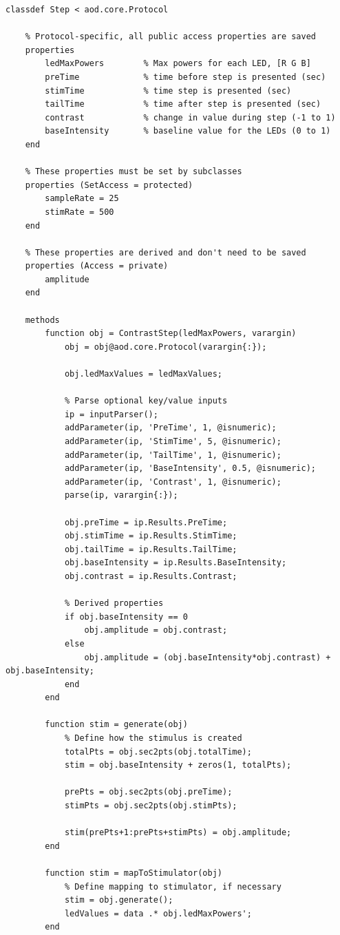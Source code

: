 \documentclass[10pt]{exam}
\begin{document}
		\begin{lstlisting}[style=Matlab-editor, basicstyle=\mlttfamily\footnotesize]
classdef Step < aod.core.Protocol
	
	% Protocol-specific, all public access properties are saved
	properties
		ledMaxPowers        % Max powers for each LED, [R G B]
		preTime             % time before step is presented (sec)
		stimTime            % time step is presented (sec)
		tailTime            % time after step is presented (sec)
		contrast            % change in value during step (-1 to 1)
		baseIntensity       % baseline value for the LEDs (0 to 1)
	end
	
	% These properties must be set by subclasses
	properties (SetAccess = protected)
		sampleRate = 25
		stimRate = 500
	end
	
	% These properties are derived and don't need to be saved
	properties (Access = private)
		amplitude
	end
	
	methods
		function obj = ContrastStep(ledMaxPowers, varargin)
			obj = obj@aod.core.Protocol(varargin{:});
			
			obj.ledMaxValues = ledMaxValues;
			
			% Parse optional key/value inputs
			ip = inputParser();
			addParameter(ip, 'PreTime', 1, @isnumeric);
			addParameter(ip, 'StimTime', 5, @isnumeric);
			addParameter(ip, 'TailTime', 1, @isnumeric);
			addParameter(ip, 'BaseIntensity', 0.5, @isnumeric);
			addParameter(ip, 'Contrast', 1, @isnumeric);
			parse(ip, varargin{:});
			
			obj.preTime = ip.Results.PreTime;
			obj.stimTime = ip.Results.StimTime;
			obj.tailTime = ip.Results.TailTime;
			obj.baseIntensity = ip.Results.BaseIntensity;
			obj.contrast = ip.Results.Contrast;

			% Derived properties
			if obj.baseIntensity == 0
				obj.amplitude = obj.contrast;
			else 
				obj.amplitude = (obj.baseIntensity*obj.contrast) + obj.baseIntensity;
			end
		end
		
		function stim = generate(obj)
			% Define how the stimulus is created
			totalPts = obj.sec2pts(obj.totalTime);
			stim = obj.baseIntensity + zeros(1, totalPts);
			
			prePts = obj.sec2pts(obj.preTime);
			stimPts = obj.sec2pts(obj.stimPts);
			
			stim(prePts+1:prePts+stimPts) = obj.amplitude;
		end
		
		function stim = mapToStimulator(obj)
			% Define mapping to stimulator, if necessary
			stim = obj.generate();
			ledValues = data .* obj.ledMaxPowers';
		end


\end{lstlisting}
\end{document}

